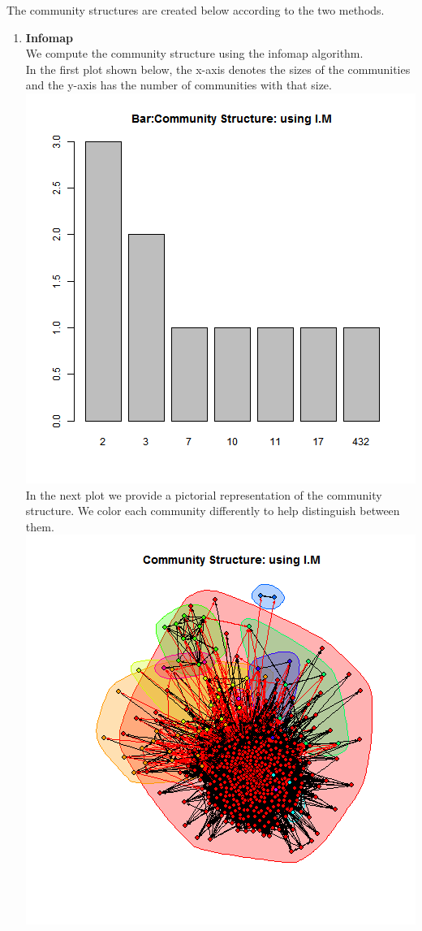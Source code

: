 \documentclass{article}
\begin{document}
The community structures are created below according to the two methods.\\
\begin{enumerate}
 \item \textbf{Infomap}\\
 We compute the community structure using the infomap algorithm.\\
 In the first plot shown below, the x-axis denotes the sizes of the communities and the y-axis has the number of communities with that size.\\
	\includegraphics[scale=0.4]{7_1b} \\
	In the next plot we provide a pictorial representation of the community structure.
	We color each community differently to help distinguish between them.\\
	\includegraphics[scale=0.7]{7_1c} \\ 


\end{enumerate}
\end{document}
